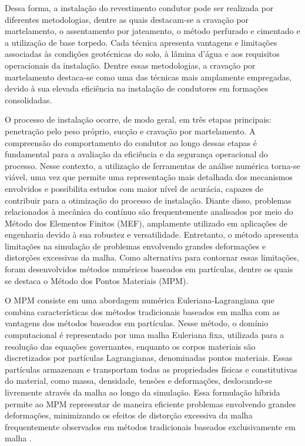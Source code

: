 Dessa forma, a instalação do revestimento condutor pode ser realizada por diferentes metodologias, dentre as quais destacam-se a cravação por martelamento, o assentamento por jateamento, o método perfurado e cimentado e a utilização de base torpedo. Cada técnica apresenta vantagens e limitações associadas às condições geotécnicas do solo, à lâmina d’água e aos requisitos operacionais da instalação. Dentre essas metodologias, a cravação por martelamento destaca-se como uma das técnicas mais amplamente empregadas, devido à sua elevada eficiência na instalação de condutores em formações consolidadas. 

O processo de instalação ocorre, de modo geral, em três etapas principais: penetração pelo peso próprio, sucção e cravação por martelamento. A compreensão do comportamento do condutor ao longo dessas etapas é fundamental para a avaliação da eficiência e da segurança operacional do processo. Nesse contexto, a utilização de ferramentas de análise numérica torna-se viável, uma vez que permite uma representação mais detalhada dos mecanismos envolvidos e possibilita estudos com maior nível de acurácia, capazes de contribuir para a otimização do processo de instalação. Diante disso, problemas relacionados à mecânica do contínuo são frequentemente analisados por meio do Método dos Elementos Finitos (MEF), amplamente utilizado em aplicações de engenharia devido à sua robustez e versatilidade. Entretanto, o método apresenta limitações na simulação de problemas envolvendo grandes deformações e distorções excessivas da malha. Como alternativa para contornar essas limitações, foram desenvolvidos métodos numéricos baseados em partículas, dentre os quais se destaca o Método dos Pontos Materiais (MPM).

O MPM consiste em uma abordagem numérica Euleriana-Lagrangiana que combina características dos métodos tradicionais baseados em malha com as vantagens dos métodos baseados em partículas. Nesse método, o domínio computacional é representado por uma malha Euleriana fixa, utilizada para a resolução das equações governantes, enquanto os corpos materiais são discretizados por partículas Lagrangianas, denominadas pontos materiais. Essas partículas armazenam e transportam todas as propriedades físicas e constitutivas do material, como massa, densidade, tensões e deformações, deslocando-se livremente através da malha ao longo da simulação. Essa formulação híbrida permite ao MPM representar de maneira eficiente problemas envolvendo grandes deformações, minimizando os efeitos de distorção excessiva da malha frequentemente observados em métodos tradicionais baseados exclusivamente em malha \cite{Yerro2022,nguyen2023}.

